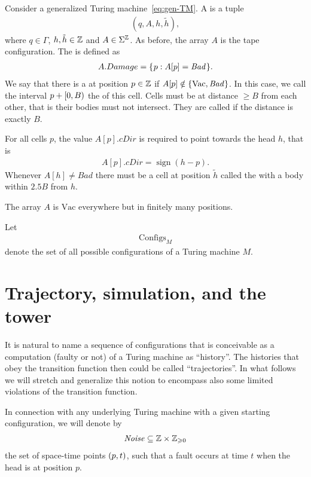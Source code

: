 \documentclass[12pt]{memoir}
\newcommand{\fld}[1]{\ensuremath{\textit{#1}}}
\newcommand{\sign}{\mathop\mathrm{sign}}
\renewcommand{\B}{B}
\newcommand{\Bad}{\mathit{Bad}}
\newcommand{\Configs}{\mathrm{Configs}}
\newcommand{\Damage}{Damage}
\newcommand{\h}{h}
\newcommand{\hc}{\tilde h}
\newcommand{\Noise}{\mathit{Noise}}
\newcommand{\cDir}{\fld{cDir}}
\newcommand{\Vacant}{\mathrm{Vac}}
\begin{document}
\begin{definition}[Configuration]\label{def:config}
     Consider a generalized Turing machine~\eqref{eq:gen-TM}.
    A  is a tuple
        \begin{align*}
             (q,A,\h,\hc),
        \end{align*}
    where $q\in\Gamma$, $\h,\hc\in\bbZ$ and $A\in\Sigma^{\mathbb{Z}}$.
As before, the array \( A \) is the tape configuration.
The  is defined as
     \begin{align*}
          A.\Damage=\setOf{p}{A[p]=\Bad}.
     \end{align*}
We say that there is a  at position $p\in\mathbb{Z}$ if
$A[p]\notin \set{\Vacant, \Bad}$.
In this case, we call the interval $p+\lint{0}{\B}$ the  of this cell.
Cells must be at distance \( \ge\B \) from each other, that is their
bodies must not intersect.
They are called  if the distance is exactly \( \B \).

For all cells \( p \), the value $A[p].\cDir$ is required to point towards 
the head \( \h \), that is 
 \begin{align*}
   A[p].\cDir=\sign(\h-p).
 \end{align*}
Whenever $A[\h]\neq \Bad$ there must be a
cell at position \( \hc \) called the  with a body 
within $2.5\B$ from $\h$.

The array \( A \) is $\Vacant$ everywhere but in finitely many positions.

Let
    \begin{align*}
         \Configs_{M}
    \end{align*}
    denote the set of all possible configurations
    of a Turing machine $M$.
\end{definition}

\section{Trajectory, simulation, and the tower}

It is natural to name a sequence of configurations that is conceivable as a computation
(faulty or not) of a Turing machine as ``history''.
The histories that obey the transition function then could be called ``trajectories''.
In what follows we will 
stretch and generalize this notion to encompass also some limited violations of the
transition function.

In connection with any underlying Turing machine with a given starting configuration, we will
denote by
\begin{align}\label{eq:noise-first}
   \Noise\subseteq \bbZ\times \bbZ_{\ge 0}
\end{align}
the set of space-time points $(p,t)$, such that
a fault occurs at time $t$ when the head is at position $p$.
\end{document}
